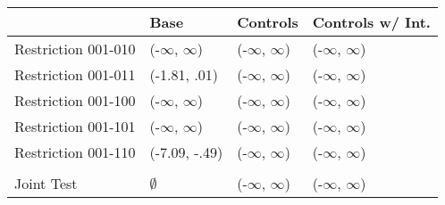 \begin{tabular}{llll}
\toprule
{} &           Base &   Controls & Controls w/ Int. \\
\midrule
Restriction 001-010 &      (-$\infty$, $\infty$) &  (-$\infty$, $\infty$) &        (-$\infty$, $\infty$) \\
Restriction 001-011 &   (-1.81, .01) &  (-$\infty$, $\infty$) &        (-$\infty$, $\infty$) \\
Restriction 001-100 &      (-$\infty$, $\infty$) &  (-$\infty$, $\infty$) &        (-$\infty$, $\infty$) \\
Restriction 001-101 &      (-$\infty$, $\infty$) &  (-$\infty$, $\infty$) &        (-$\infty$, $\infty$) \\
Restriction 001-110 &  (-7.09, -.49) &  (-$\infty$, $\infty$) &        (-$\infty$, $\infty$) \\
\hline\\Joint Test  &         $\emptyset$ &  (-$\infty$, $\infty$) &        (-$\infty$, $\infty$) \\
\bottomrule
\end{tabular}
